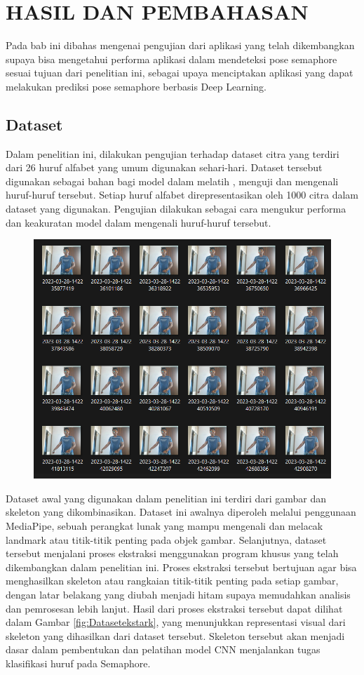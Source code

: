 \chapter{HASIL DAN PEMBAHASAN}
Pada bab ini dibahas mengenai pengujian dari aplikasi yang telah dikembangkan supaya bisa mengetahui performa aplikasi dalam mendeteksi pose semaphore sesuai tujuan dari penelitian ini, sebagai upaya menciptakan aplikasi yang dapat melakukan prediksi pose semaphore berbasis Deep Learning.

\section{Dataset}
Dalam penelitian ini, dilakukan pengujian terhadap dataset citra yang terdiri dari 26 huruf alfabet yang umum digunakan sehari-hari. Dataset tersebut digunakan sebagai bahan bagi  model dalam  melatih , menguji dan mengenali huruf-huruf tersebut. Setiap huruf alfabet direpresentasikan oleh 1000 citra dalam dataset yang digunakan. Pengujian dilakukan sebagai cara mengukur performa dan keakuratan model dalam mengenali huruf-huruf tersebut.

\begin{figure}[!hbt]
	\centering
	\includegraphics[width=0.7\linewidth]{gambar/citra_dataset.png}
	\label{fig:Datasetraw}
\end{figure}

Dataset awal yang digunakan dalam penelitian ini terdiri dari gambar dan skeleton yang dikombinasikan. Dataset ini awalnya diperoleh melalui penggunaan MediaPipe, sebuah perangkat lunak yang mampu mengenali dan melacak landmark atau titik-titik penting pada objek gambar. Selanjutnya, dataset tersebut menjalani proses ekstraksi menggunakan program khusus yang telah dikembangkan dalam penelitian ini. Proses ekstraksi tersebut bertujuan agar bisa menghasilkan skeleton atau rangkaian titik-titik penting pada setiap gambar, dengan latar belakang yang diubah menjadi hitam supaya memudahkan analisis dan pemrosesan lebih lanjut. Hasil dari proses ekstraksi tersebut dapat dilihat dalam Gambar \ref{fig:Datasetekstark}, yang menunjukkan representasi visual dari skeleton yang dihasilkan dari dataset tersebut. Skeleton tersebut akan menjadi dasar dalam pembentukan dan pelatihan model CNN menjalankan tugas klasifikasi huruf pada Semaphore.

